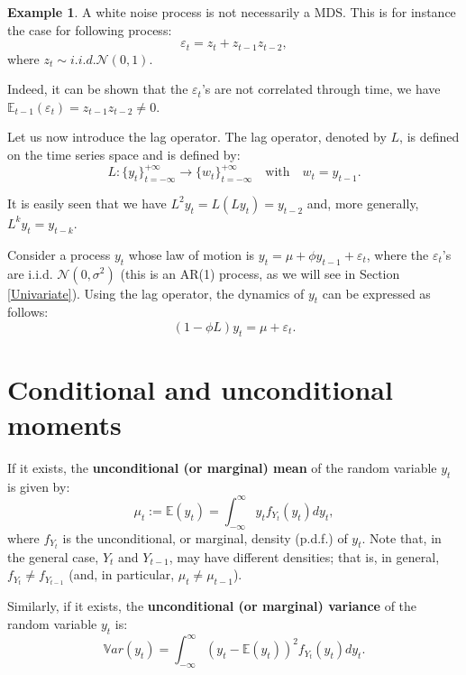\documentclass[
  12pt,
]{book}
\theoremstyle{definition}
\theoremstyle{definition}
\newtheorem{example}{Example}[chapter]
\theoremstyle{definition}
\theoremstyle{definition}
\theoremstyle{remark}
\begin{document}
\begin{example}
\protect\hypertarget{exm:whiteNotMDS}{}\label{exm:whiteNotMDS}A white noise process is not necessarily a MDS. This is for instance the case for following process:
\[
\varepsilon_{t} = z_t + z_{t-1}z_{t-2},
\]
where \(z_t \sim i.i.d.\mathcal{N}(0,1)\).

Indeed, it can be shown that the \(\varepsilon_t\)'s are not correlated through time, we have \(\mathbb{E}_{t-1}(\varepsilon_t)=z_{t-1}z_{t-2} \ne 0\).
\end{example}

Let us now introduce the lag operator. The lag operator, denoted by \(L\), is defined on the time series space and is defined by:
\begin{equation}
L: \{y_t\}_{t=-\infty}^{+\infty} \rightarrow \{w_t\}_{t=-\infty}^{+\infty} \quad \mbox{with} \quad w_t = y_{t-1}.\label{eq:lagOp}
\end{equation}

It is easily seen that we have \(L^2 y_t =L(L y_t) = y_{t-2}\) and, more generally, \(L^k y_t = y_{t-k}\).

Consider a process \(y_t\) whose law of motion is \(y_t = \mu + \phi y_{t-1} + \varepsilon_t\), where the \(\varepsilon_t\)'s are i.i.d. \(\mathcal{N}(0,\sigma^2)\) (this is an AR(1) process, as we will see in Section \ref{Univariate}). Using the lag operator, the dynamics of \(y_t\) can be expressed as follows:
\[
(1-\phi L) y_t = \mu + \varepsilon_t.
\]

\hypertarget{conditional-and-unconditional-moments}{%
\section{Conditional and unconditional moments}\label{conditional-and-unconditional-moments}}

If it exists, the \textbf{unconditional (or marginal) mean} of the random variable \(y_t\) is given by:
\[
\mu_t := \mathbb{E}(y_t) = \int_{-\infty}^{\infty} y_t f_{Y_t}(y_t) dy_t,
\]
where \(f_{Y_t}\) is the unconditional, or marginal, density (p.d.f.) of \(y_t\). Note that, in the general case, \(Y_t\) and \(Y_{t-1}\), may have different densities; that is, in general, \(f_{Y_t} \ne f_{Y_{t-1}}\) (and, in particular, \(\mu_t \ne \mu_{t-1}\)).

Similarly, if it exists, the \textbf{unconditional (or marginal) variance} of the random variable \(y_t\) is:
\[
\mathbb{V}ar(y_t) = \int_{-\infty}^{\infty} (y_t - \mathbb{E}(y_t))^2 f_{Y_t}(y_t) dy_t.
\]
\end{document}
